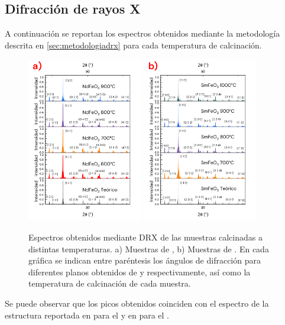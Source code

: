 \documentclass[../main.tex]{subfiles}
\begin{document}
\subsection{Difracción de rayos X} \label{sec:analisisDRX}
A continuación se reportan los espectros obtenidos mediante la metodología descrita en \ref{sec:metodologiadrx} para cada temperatura de calcinación.
\begin{figure}[H]
    \centering
    \includegraphics[width=0.45\textwidth]{fig/drxtempndfeo3.png}
    \quad
    \includegraphics[width=0.45\textwidth]{fig/drxtempsmfeo3.png}
    \caption{Espectros obtenidos mediante DRX de las muestras calcinadas a distintas temperaturas. a) Muestras de \neod{}, b) Muestras de \sama{}. En cada gráfica se indican entre paréntesis los ángulos de difracción para diferentes planos obtenidos de \cite{ndfeo3} y \cite{smfeo3} respectivamente, así como la temperatura de calcinación de cada muestra.}
    \label{fig:drxtempcomp}
\end{figure}
Se puede observar que los picos obtenidos coinciden con el espectro de la estructura reportada en \cite{ndfeo3} para el \neod{} y en \cite{smfeo3} para el \sama{}.
\end{document}
